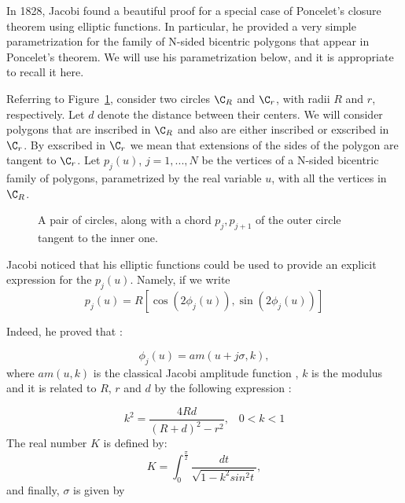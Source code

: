 In 1828, Jacobi found a beautiful proof for a special case of Poncelet's closure theorem using elliptic functions. In particular, he provided a very simple parametrization for the family of N-sided bicentric polygons that appear in Poncelet's theorem. We will use his parametrization below, and it is appropriate to recall it here.

Referring to Figure~\ref{fig:jacobi-nested}, %
consider two circles $\C_{R}$ and $\C_{r}$, with radii $R$ and $r$, respectively. Let $d$ denote the distance between their centers. We will consider polygons that are inscribed in $\C_{R}$ and also are either inscribed or exscribed in $\C_{r}$. By exscribed in $\C_{r}$ we mean that extensions of the sides of the polygon are tangent to $\C_{r}$. Let $p_{j}(u)$, $j=1,...,N$ be the vertices of a N-sided bicentric family of polygons, parametrized by the real variable $u$, with all the vertices in $\C_{R}$.

\begin{figure}
    \centering
    \caption{A pair of circles, along with a chord $p_j,p_{j+1}$ of the outer circle tangent to the inner one.}
    \label{fig:jacobi-nested}
\end{figure}


Jacobi noticed that his elliptic functions could be used to provide an explicit expression for the $p_{j}(u)$. Namely, if we write
\begin{equation}
\label{jacobivertex}  
p_{j}(u)=R\left[ \cos{(2\phi_{j}(u))}, \sin{(2\phi_{j}(u))}\right]
\end{equation}

Indeed, he proved that \cite{bos-1987}:

\begin{equation}
\label{jacobiangle}
\phi_{j}(u)=am(u+ j \sigma,k),
\end{equation}
%
where $am(u,k)$ is the classical Jacobi amplitude function \cite{armitage-2006}, $k$ is the modulus and it is related to $R$, $r$ and $d$ by the following expression \cite[pp. 315]{bos-1987}:

\begin{equation}
\label{jacobirelation}
k^2=\frac{4Rd}{(R+d)^2-r^2},\;\;\;0<k<1
\end{equation}
The real number $K$ is defined by:
%
\[K=\int_{0}^{\frac{\pi}{2}} \frac{dt}{\sqrt{1-k^2sin^2{t}}}, \]
and finally, $\sigma$ is given by

